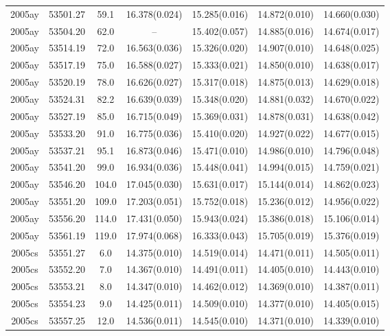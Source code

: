 \begin{table*}
\begin{tabular}{ccccccc}
2005ay	  & 53501.27	 & 59.1	& 16.378(0.024)	 & 15.285(0.016)	 & 14.872(0.010)	 & 14.660(0.030) \\ 
2005ay	  & 53504.20	 & 62.0	& --	 & 15.402(0.057)	 & 14.885(0.016)	 & 14.674(0.017) \\ 
2005ay	  & 53514.19	 & 72.0	& 16.563(0.036)	 & 15.326(0.020)	 & 14.907(0.010)	 & 14.648(0.025) \\ 
2005ay	  & 53517.19	 & 75.0	& 16.588(0.027)	 & 15.333(0.021)	 & 14.850(0.010)	 & 14.638(0.017) \\ 
2005ay	  & 53520.19	 & 78.0	& 16.626(0.027)	 & 15.317(0.018)	 & 14.875(0.013)	 & 14.629(0.018) \\ 
2005ay	  & 53524.31	 & 82.2	& 16.639(0.039)	 & 15.348(0.020)	 & 14.881(0.032)	 & 14.670(0.022) \\ 
2005ay	  & 53527.19	 & 85.0	& 16.715(0.049)	 & 15.369(0.031)	 & 14.878(0.031)	 & 14.638(0.042) \\ 
2005ay	  & 53533.20	 & 91.0	& 16.775(0.036)	 & 15.410(0.020)	 & 14.927(0.022)	 & 14.677(0.015) \\ 
2005ay	  & 53537.21	 & 95.1	& 16.873(0.046)	 & 15.471(0.010)	 & 14.986(0.010)	 & 14.796(0.048) \\ 
2005ay	  & 53541.20	 & 99.0	& 16.934(0.036)	 & 15.448(0.041)	 & 14.994(0.015)	 & 14.759(0.021) \\ 
2005ay	  & 53546.20	 & 104.0	& 17.045(0.030)	 & 15.631(0.017)	 & 15.144(0.014)	 & 14.862(0.023) \\ 
2005ay	  & 53551.20	 & 109.0	& 17.203(0.051)	 & 15.752(0.018)	 & 15.236(0.012)	 & 14.956(0.022) \\ 
2005ay	  & 53556.20	 & 114.0	& 17.431(0.050)	 & 15.943(0.024)	 & 15.386(0.018)	 & 15.106(0.014) \\ 
2005ay	  & 53561.19	 & 119.0	& 17.974(0.068)	 & 16.333(0.043)	 & 15.705(0.019)	 & 15.376(0.019) \\ 
2005cs	  & 53551.27	 & 6.0	& 14.375(0.010)	 & 14.519(0.014)	 & 14.471(0.011)	 & 14.505(0.011) \\ 
2005cs	  & 53552.20	 & 7.0	& 14.367(0.010)	 & 14.491(0.011)	 & 14.405(0.010)	 & 14.443(0.010) \\ 
2005cs	  & 53553.21	 & 8.0	& 14.347(0.010)	 & 14.462(0.012)	 & 14.369(0.010)	 & 14.387(0.011) \\ 
2005cs	  & 53554.23	 & 9.0	& 14.425(0.011)	 & 14.509(0.010)	 & 14.377(0.010)	 & 14.405(0.015) \\ 
2005cs	  & 53557.25	 & 12.0	& 14.536(0.011)	 & 14.545(0.010)	 & 14.371(0.010)	 & 14.339(0.010) \\ 

\end{tabular}
\end{table*}
